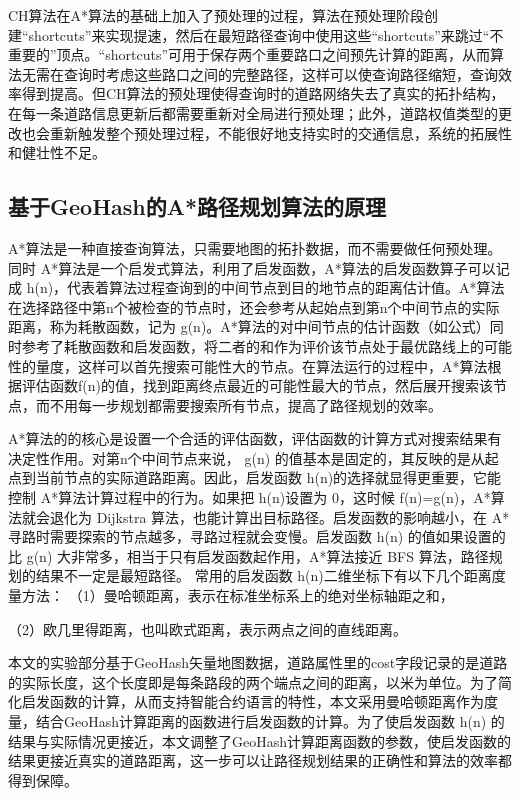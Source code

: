 CH算法在A*算法的基础上加入了预处理的过程，算法在预处理阶段创建“shortcuts”来实现提速，然后在最短路径查询中使用这些“shortcuts”来跳过“不重要的”顶点。“shortcuts”可用于保存两个重要路口之间预先计算的距离，从而算法无需在查询时考虑这些路口之间的完整路径，这样可以使查询路径缩短，查询效率得到提高。但CH算法的预处理使得查询时的道路网络失去了真实的拓扑结构，在每一条道路信息更新后都需要重新对全局进行预处理；此外，道路权值类型的更改也会重新触发整个预处理过程，不能很好地支持实时的交通信息，系统的拓展性和健壮性不足。

\subsection{基于GeoHash的A*路径规划算法的原理}
A*算法是一种直接查询算法，只需要地图的拓扑数据，而不需要做任何预处理。同时 A*算法是一个启发式算法，利用了启发函数，A*算法的启发函数算子可以记成 h(n)，代表着算法过程查询到的中间节点到目的地节点的距离估计值。A*算法在选择路径中第n个被检查的节点时，还会参考从起始点到第n个中间节点的实际距离，称为耗散函数，记为 g(n)。A*算法的对中间节点的估计函数（如公式）同时参考了耗散函数和启发函数，将二者的和作为评价该节点处于最优路线上的可能性的量度，这样可以首先搜索可能性大的节点。在算法运行的过程中，A*算法根据评估函数f(n)的值，找到距离终点最近的可能性最大的节点，然后展开搜索该节点，而不用每一步规划都需要搜索所有节点，提高了路径规划的效率。

A*算法的的核心是设置一个合适的评估函数，评估函数的计算方式对搜索结果有决定性作用。对第n个中间节点来说， g(n) 的值基本是固定的，其反映的是从起点到当前节点的实际道路距离。因此，启发函数 h(n)的选择就显得更重要，它能控制 A*算法计算过程中的行为。如果把 h(n)设置为 0，这时候 f(n)=g(n)，A*算法就会退化为 Dijkstra 算法，也能计算出目标路径。启发函数的影响越小，在 A*寻路时需要探索的节点越多，寻路过程就会变慢。启发函数 h(n) 的值如果设置的比 g(n) 大非常多，相当于只有启发函数起作用，A*算法接近 BFS 算法，路径规划的结果不一定是最短路径。
常用的启发函数 h(n)二维坐标下有以下几个距离度量方法：
（1）曼哈顿距离，表示在标准坐标系上的绝对坐标轴距之和，

（2）欧几里得距离，也叫欧式距离，表示两点之间的直线距离。

本文的实验部分基于GeoHash矢量地图数据，道路属性里的cost字段记录的是道路的实际长度，这个长度即是每条路段的两个端点之间的距离，以米为单位。为了简化启发函数的计算，从而支持智能合约语言的特性，本文采用曼哈顿距离作为度量，结合GeoHash计算距离的函数进行启发函数的计算。为了使启发函数 h(n) 的结果与实际情况更接近，本文调整了GeoHash计算距离函数的参数，使启发函数的结果更接近真实的道路距离，这一步可以让路径规划结果的正确性和算法的效率都得到保障。


